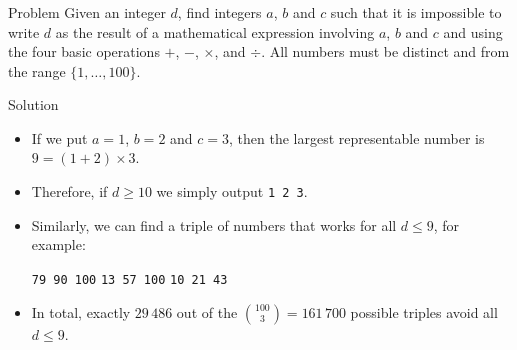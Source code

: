 \begin{frame}
  \frametitle{\problemtitle}
  \begin{block}{Problem}
    Given an integer $d$, find integers $a$, $b$ and $c$ such that it is impossible to write $d$ as the result of a mathematical expression involving $a$, $b$ and $c$ and using the four basic operations $+$, $-$, $\times$, and $\div$.
    All numbers must be distinct and from the range $\{1,\dots,100\}$.
  \end{block}
  \pause
  \begin{block}{Solution}
    \begin{itemize}
      \item<+-> If we put $a=1$, $b=2$ and $c=3$, then the largest representable number is $9 = (1+2)\times 3$.
      \item<+-> Therefore, if $d \ge 10$ we simply output \texttt{1 2 3}.
      \item<+-> Similarly, we can find a triple of numbers that works for all $d \le 9$, for example:
        \begin{center}
          \texttt{79 90 100} \qquad \texttt{13 57 100} \qquad \texttt{10 21 43}
        \end{center}
      \item<+-> In total, exactly $29\,486$ out of the $\binom{100}{3} = 161\,700$ possible triples avoid all $d \le 9$.
    \end{itemize}
  \end{block}
\end{frame}

